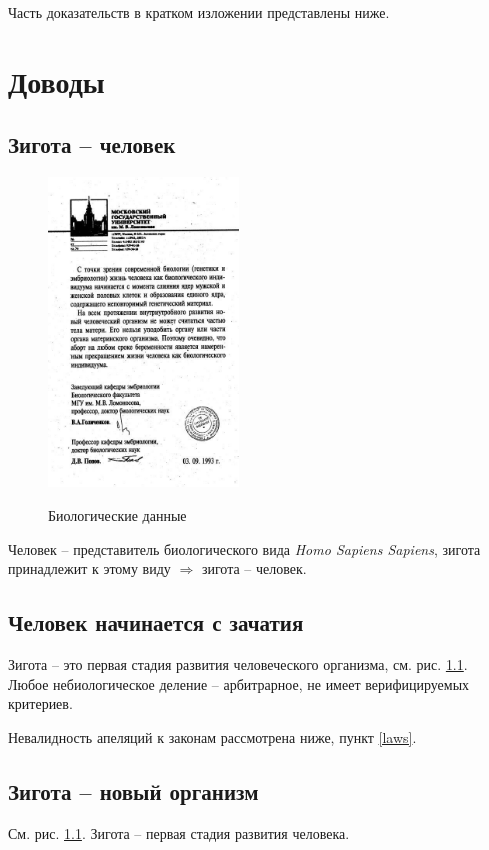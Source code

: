 \documentclass[a4paper,12pt]{report}
\begin{document}
Часть доказательств в кратком изложении представлены ниже. 

\chapter{Доводы}
    \section{Зигота -- человек}\label{ishuman}
        \begin{figure}[!h]
            \centering
            \includegraphics[width=0.45\textwidth]{evidence.jpg}\label{evidence}
            \caption{Биологические данные}
        \end{figure}
     
        Человек -- представитель биологического вида \textit{Homo Sapiens Sapiens}, зигота принадлежит к этому виду $\Rightarrow$ зигота -- человек.
	\section{Человек начинается с зачатия}
        Зигота -- это первая стадия развития человеческого организма, см. рис. \ref{evidence}. 
        Любое небиологическое деление -- арбитрарное, не имеет верифицируемых критериев. 

        Невалидность апеляций к законам рассмотрена ниже, пункт \ref{laws}.
	\section{Зигота -- новый организм}
        См. рис. \ref{evidence}. Зигота -- первая стадия развития человека.
\end{document}
